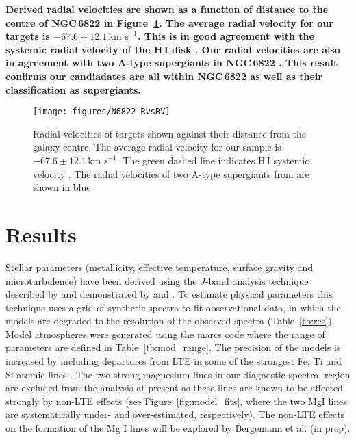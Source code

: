 \documentclass[iop]{emulateapj}
\def\kms{$\mbox{km s}^{-1}$}
\begin{document}
\textbf{
  Derived radial velocities are shown as a function of distance to the centre of NGC\,6822 in Figure~\ref{fig:RvsRV}.
  The average radial velocity for our targets is $-67.6\pm12.1$\,\kms.
  This is in good agreement with the systemic radial velocity of the H\,I disk
  \citep[$-57\pm2$\,\kms;][]{2004AJ....128...16K}.
  Our radial velocities are also in agreement with two A-type supergiants in NGC\,6822
  \citep{2001ApJ...547..765V}.
  This result confirms our candiadates are all within NGC\,6822 as well as their classification as supergiants.}

\begin{figure}
\texttt{[image: figures/N6822\_RvsRV]}
\caption{
Radial velocities of targets shown against their distance from the galaxy centre.
The average radial velocity for our sample is $-67.6\pm12.1$\,\kms.
The green dashed line indicates H\,I systemic velocity
\protect\citep[$-57\pm2$\,\kms;][]{2004AJ....128...16K}.
The radial velocities of two A-type supergiants from
\protect\cite{2001ApJ...547..765V} are shown in blue.
        }
\label{fig:RvsRV}
\end{figure}



\section{Results} %
\label{sec:results}

Stellar parameters
(metallicity, effective temperature, surface gravity and microturbulence)
have been derived using the $J$-band analysis technique described by
\cite{2010MNRAS.407.1203D} and demonstrated by
\cite{Davies-prep} and
\cite{2014ApJ...788...58G}.
To estimate physical parameters this technique uses a grid of synthetic spectra to fit observational data,
in which the models are degraded to the resolution of the observed spectra
(Table~\ref{tb:res}).
Model atmospheres were generated using the {\sc marcs} code
\citep{2008A&A...486..951G} where the range of parameters are defined in
Table~\ref{tb:mod_range}.
The precision of the models is increased by including departures from LTE in some of the strongest Fe, Ti and Si atomic lines
\citep{2012ApJ...751..156B,2013ApJ...764..115B}.
The two strong magnesium lines in our diagnostic spectral region are excluded from the analysis at present as these lines are known to be affected strongly by non-LTE effects
(see Figure~\ref{fig:model_fits}, where the two MgI lines are systematically under- and over-estimated, respectively).
The non-LTE effects on the formation of the Mg I lines will be explored by
Bergemann et al. (in prep).
\end{document}
